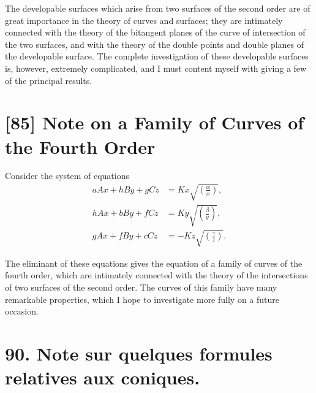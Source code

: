 \documentclass[11pt,a4paper]{book}
\begin{document}
The developable surfaces which arise from two surfaces of the second order are of great importance in the theory of curves and surfaces; they are intimately connected with the theory of the bitangent planes of the curve of intersection of the two surfaces, and with the theory of the double points and double planes of the developable surface. The complete investigation of these developable surfaces is, however, extremely complicated, and I must content myself with giving a few of the principal results.

\newpage
\section*{[85] Note on a Family of Curves of the Fourth Order}

\bigskip

Consider the system of equations
\begin{align*}
aAx + hBy + gCz &= Kx\sqrt{\left(\frac{\alpha}{x}\right)}, \\
hAx + bBy + fCz &= Ky\sqrt{\left(\frac{\beta}{y}\right)}, \\
gAx + fBy + cCz &= -Kz\sqrt{\left(\frac{\gamma}{z}\right)}.
\end{align*}

The eliminant of these equations gives the equation of a family of curves of the fourth order, which are intimately connected with the theory of the intersections of two surfaces of the second order. The curves of this family have many remarkable properties, which I hope to investigate more fully on a future occasion.
\clearpage


\thispagestyle{empty}


\newpage


\section*{90. Note sur quelques formules relatives aux coniques.}
\end{document}
